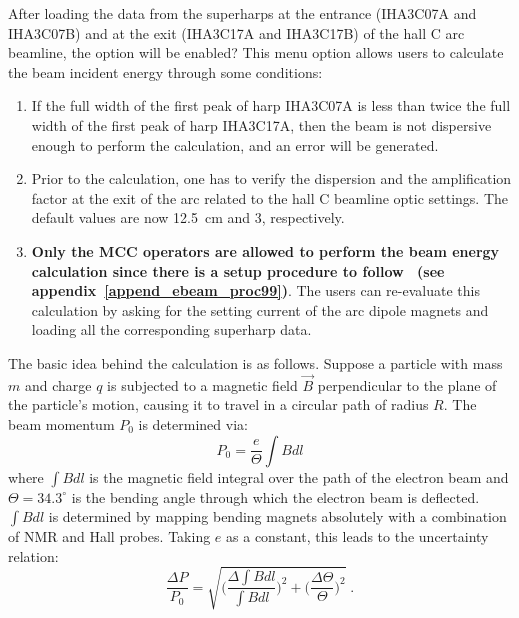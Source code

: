 {After loading the data from the superharps at the entrance (IHA3C07A and IHA3C07B) and at
the exit (IHA3C17A and IHA3C17B) of the hall C arc beamline, 
the  option
will be enabled?  This menu option allows users to calculate the beam incident energy through some
conditions:
\begin{enumerate}
\item If the full width of the first peak of harp IHA3C07A is less than twice the full
width of the first peak of harp IHA3C17A, then the beam is not dispersive enough to perform the
calculation, and an error will be generated.
\item Prior to the calculation, one has to verify the dispersion and the amplification factor at the
exit of the arc related to the hall C beamline optic settings. The default values are now 12.5~cm and 3,
respectively.
\item {\bf Only the MCC operators are allowed to perform the beam energy calculation since there is a setup
procedure to follow~\cite{ebeam_proc99} (see
appendix~\ref{append_ebeam_proc99})}.  The users can
re-evaluate this calculation by asking for the setting current of the arc dipole magnets and loading all
the corresponding superharp data.
\end{enumerate}

The basic idea behind the calculation is as follows.
Suppose a particle with mass $m$ and charge $q$ is subjected to a magnetic field $\vec{B}$ perpendicular
to the plane of the particle's motion, causing it to travel in a circular path of radius $R$. The beam
momentum $P_0$ is determined via:
\begin{equation}
P_0 = \frac{e}{\Theta}\int Bdl
\end{equation}
where $\int Bdl$ is the magnetic field integral over the path of the electron beam and
$\Theta = 34.3^\circ$ is the bending angle through which the electron beam is deflected. $\int Bdl$ is
determined by mapping bending magnets absolutely with a combination of NMR and Hall probes. Taking $e$
as a constant, this leads to the uncertainty relation:
\begin{equation}
\frac{\Delta P}{P_0} = \sqrt{\Big (\frac{\Delta \int Bdl}{\int Bdl}\Big )^{2}
                     + \Big (\frac{\Delta \Theta}{\Theta}\Big )^{2}} \; .
\end{equation}

}
